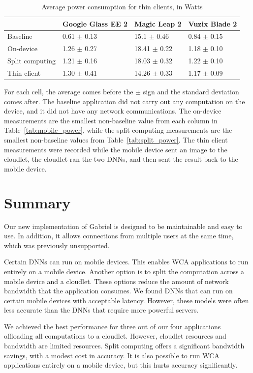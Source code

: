 \begin{table}
\begin{tabular}{|l||l|l|l|}
  \hline
  & Google Glass EE 2 & Magic Leap 2 & Vuzix Blade 2\\
  \hline
  \hline
  Baseline & 0.61 $\pm$ 0.13 & 15.1 $\pm$ 0.46 & 0.84 $\pm$ 0.15\\
  On-device & 1.26 $\pm$ 0.27 & 18.41 $\pm$ 0.22 & 1.18 $\pm$ 0.10\\
  Split computing & 1.21 $\pm$ 0.16 & 18.03 $\pm$ 0.32 & 1.22 $\pm$ 0.10\\
  Thin client & 1.30 $\pm$ 0.41 & 14.26 $\pm$ 0.33 & 1.17 $\pm$ 0.09\\
  \hline
\end{tabular}
\begin{captiontext}
    For each cell, the average comes before the $\pm$ sign and the standard
    deviation comes after.
    The baseline application did not carry out any computation on the device,
    and it did not have any network communications.
    The on-device measurements are the smallest non-baseline value from
    each column in Table~\ref{tab:mobile_power}, while the split computing
    measurements are the smallest non-baseline values from
    Table~\ref{tab:split_power}.
    The thin client measurements were recorded while the mobile device sent an
    image to the cloudlet, the cloudlet ran the two DNNs, and then sent the
    result back to the mobile device.
\end{captiontext}
  \caption{
    Average power consumption for thin clients, in Watts
  }\label{tab:thin_power}
\end{table}

\section{Summary}

Our new implementation of Gabriel is designed to be maintainable and easy to
use.
In addition, it allows connections from multiple users at the same time, which
was previously unsupported.

Certain DNNs can run on mobile devices.
This enables WCA applications to run entirely on a mobile device.
Another option is to split the computation across a mobile device and a
cloudlet.
These options reduce the amount of network bandwidth that the application
consumes.
We found DNNs that can run on certain mobile devices with acceptable latency.
However, these models were often less accurate than the DNNs that require more
powerful servers.

We achieved the best performance for three out of our four applications
offloading all computations to a cloudlet.
However, cloudlet resources and bandwidth are limited resources.
Split computing offers a significant bandwidth savings, with a modest cost in
accuracy.
It is also possible to run WCA applications entirely on a mobile device, but
this hurts accuracy significantly.

